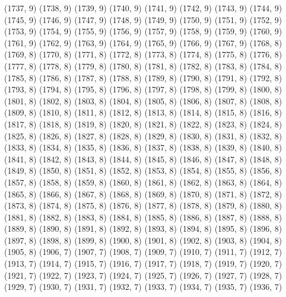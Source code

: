 {   (1737, 9)
   (1738, 9)
   (1739, 9)
   (1740, 9)
   (1741, 9)
   (1742, 9)
   (1743, 9)
   (1744, 9)
   (1745, 9)
   (1746, 9)
   (1747, 9)
   (1748, 9)
   (1749, 9)
   (1750, 9)
   (1751, 9)
   (1752, 9)
   (1753, 9)
   (1754, 9)
   (1755, 9)
   (1756, 9)
   (1757, 9)
   (1758, 9)
   (1759, 9)
   (1760, 9)
   (1761, 9)
   (1762, 9)
   (1763, 9)
   (1764, 9)
   (1765, 9)
   (1766, 9)
   (1767, 9)
   (1768, 8)
   (1769, 8)
   (1770, 8)
   (1771, 8)
   (1772, 8)
   (1773, 8)
   (1774, 8)
   (1775, 8)
   (1776, 8)
   (1777, 8)
   (1778, 8)
   (1779, 8)
   (1780, 8)
   (1781, 8)
   (1782, 8)
   (1783, 8)
   (1784, 8)
   (1785, 8)
   (1786, 8)
   (1787, 8)
   (1788, 8)
   (1789, 8)
   (1790, 8)
   (1791, 8)
   (1792, 8)
   (1793, 8)
   (1794, 8)
   (1795, 8)
   (1796, 8)
   (1797, 8)
   (1798, 8)
   (1799, 8)
   (1800, 8)
   (1801, 8)
   (1802, 8)
   (1803, 8)
   (1804, 8)
   (1805, 8)
   (1806, 8)
   (1807, 8)
   (1808, 8)
   (1809, 8)
   (1810, 8)
   (1811, 8)
   (1812, 8)
   (1813, 8)
   (1814, 8)
   (1815, 8)
   (1816, 8)
   (1817, 8)
   (1818, 8)
   (1819, 8)
   (1820, 8)
   (1821, 8)
   (1822, 8)
   (1823, 8)
   (1824, 8)
   (1825, 8)
   (1826, 8)
   (1827, 8)
   (1828, 8)
   (1829, 8)
   (1830, 8)
   (1831, 8)
   (1832, 8)
   (1833, 8)
   (1834, 8)
   (1835, 8)
   (1836, 8)
   (1837, 8)
   (1838, 8)
   (1839, 8)
   (1840, 8)
   (1841, 8)
   (1842, 8)
   (1843, 8)
   (1844, 8)
   (1845, 8)
   (1846, 8)
   (1847, 8)
   (1848, 8)
   (1849, 8)
   (1850, 8)
   (1851, 8)
   (1852, 8)
   (1853, 8)
   (1854, 8)
   (1855, 8)
   (1856, 8)
   (1857, 8)
   (1858, 8)
   (1859, 8)
   (1860, 8)
   (1861, 8)
   (1862, 8)
   (1863, 8)
   (1864, 8)
   (1865, 8)
   (1866, 8)
   (1867, 8)
   (1868, 8)
   (1869, 8)
   (1870, 8)
   (1871, 8)
   (1872, 8)
   (1873, 8)
   (1874, 8)
   (1875, 8)
   (1876, 8)
   (1877, 8)
   (1878, 8)
   (1879, 8)
   (1880, 8)
   (1881, 8)
   (1882, 8)
   (1883, 8)
   (1884, 8)
   (1885, 8)
   (1886, 8)
   (1887, 8)
   (1888, 8)
   (1889, 8)
   (1890, 8)
   (1891, 8)
   (1892, 8)
   (1893, 8)
   (1894, 8)
   (1895, 8)
   (1896, 8)
   (1897, 8)
   (1898, 8)
   (1899, 8)
   (1900, 8)
   (1901, 8)
   (1902, 8)
   (1903, 8)
   (1904, 8)
   (1905, 8)
   (1906, 7)
   (1907, 7)
   (1908, 7)
   (1909, 7)
   (1910, 7)
   (1911, 7)
   (1912, 7)
   (1913, 7)
   (1914, 7)
   (1915, 7)
   (1916, 7)
   (1917, 7)
   (1918, 7)
   (1919, 7)
   (1920, 7)
   (1921, 7)
   (1922, 7)
   (1923, 7)
   (1924, 7)
   (1925, 7)
   (1926, 7)
   (1927, 7)
   (1928, 7)
   (1929, 7)
   (1930, 7)
   (1931, 7)
   (1932, 7)
   (1933, 7)
   (1934, 7)
   (1935, 7)
   (1936, 7)
}
